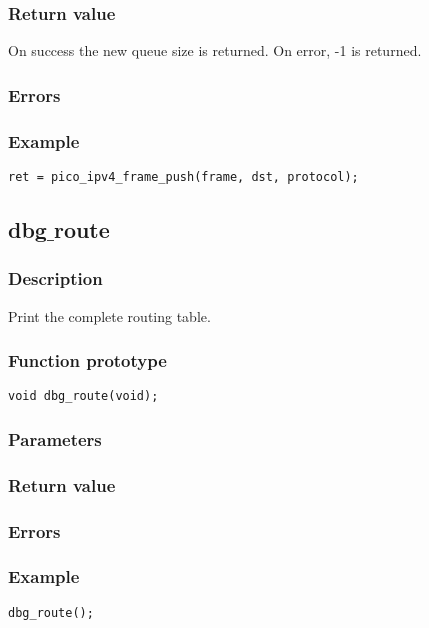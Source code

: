 \subsubsection*{Return value}
On success the new queue size is returned. On error, -1 is returned.

\subsubsection*{Errors}

\subsubsection*{Example}
\begin{verbatim}
ret = pico_ipv4_frame_push(frame, dst, protocol);
\end{verbatim}



\subsection{dbg$\_$route}

\subsubsection*{Description}
Print the complete routing table. 

\subsubsection*{Function prototype}
\begin{verbatim}
void dbg_route(void);
\end{verbatim}

\subsubsection*{Parameters}

\subsubsection*{Return value}

\subsubsection*{Errors}

\subsubsection*{Example}
\begin{verbatim}
dbg_route();
\end{verbatim}



